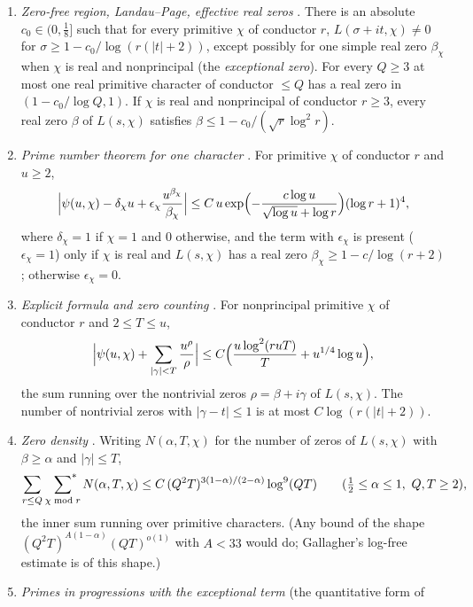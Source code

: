 \documentclass[11pt]{amsart}
\theoremstyle{plain}
\theoremstyle{definition}
\numberwithin{equation}{section}
\begin{document}
\begin{enumerate}[label=\textup{(N\arabic*)}, leftmargin=3.2em]
\item\label{N1} \emph{Zero-free region, Landau--Page, effective real zeros}
  \cite[Chapter~14]{davenport}. There is an absolute $c_0\in(0,\frac18]$ such that for every
  primitive $\chi$ of conductor $r$, $L(\sigma+it,\chi)\ne0$ for
  $\sigma\ge1-c_0/\log(r(|t|+2))$, except possibly for one simple real zero $\beta_\chi$ when
  $\chi$ is real and nonprincipal (the \emph{exceptional zero}). For every $Q\ge3$ at most one real
  primitive character of conductor $\le Q$ has a real zero in $(1-c_0/\log Q,1)$. If $\chi$ is real
  and nonprincipal of conductor $r\ge3$, every real zero $\beta$ of $L(s,\chi)$ satisfies
  $\beta\le1-c_0/(\sqrt r\log^2 r)$.
\item\label{N2} \emph{Prime number theorem for one character} \cite[Theorem~5.27]{iwaniec-kowalski}.
  For primitive $\chi$ of conductor $r$ and $u\ge2$,
  \[
  \Bigl|\psi(u,\chi)-\delta_\chi u+\epsilon_\chi\frac{u^{\beta_\chi}}{\beta_\chi}\Bigr|
  \le C\,u\exp\Bigl(-\frac{c\log u}{\sqrt{\log u}+\log r}\Bigr)(\log r+1)^4,
  \]
  where $\delta_\chi=1$ if $\chi=1$ and $0$ otherwise, and the term with $\epsilon_\chi$ is present
  ($\epsilon_\chi=1$) only if $\chi$ is real and $L(s,\chi)$ has a real zero
  $\beta_\chi\ge1-c/\log(r+2)$; otherwise $\epsilon_\chi=0$.
\item\label{N3} \emph{Explicit formula and zero counting} \cite[Chapters~16 and~19]{davenport}.
  For nonprincipal primitive $\chi$ of conductor $r$ and $2\le T\le u$,
  \[
  \Bigl|\psi(u,\chi)+\sum_{|\gamma|<T}\frac{u^\rho}{\rho}\Bigr|\le C\Bigl(\frac{u\log^2(ruT)}{T}+u^{1/4}\log u\Bigr),
  \]
  the sum running over the nontrivial zeros $\rho=\beta+i\gamma$ of $L(s,\chi)$. The number of
  nontrivial zeros with $|\gamma-t|\le1$ is at most $C\log(r(|t|+2))$.
\item\label{N4} \emph{Zero density} \cite[Theorem~12.2]{montgomery-topics}. Writing
  $N(\alpha,T,\chi)$ for the number of zeros of $L(s,\chi)$ with $\beta\ge\alpha$ and
  $|\gamma|\le T$,
  \[
  \sum_{r\le Q}\ \sideset{}{^*}\sum_{\chi\bmod r}N(\alpha,T,\chi)\le C\,(Q^2T)^{3(1-\alpha)/(2-\alpha)}\log^9(QT)
  \qquad(\tfrac12\le\alpha\le1,\ Q,T\ge2),
  \]
  the inner sum running over primitive characters. (Any bound of the shape
  $(Q^2T)^{A(1-\alpha)}(QT)^{o(1)}$ with $A<33$ would do; Gallagher's log-free estimate
  \cite[Theorem~6]{gallagher} is of this shape.)
\item\label{N5} \emph{Primes in progressions with the exceptional term} (the quantitative form of

\end{enumerate}
\end{document}
